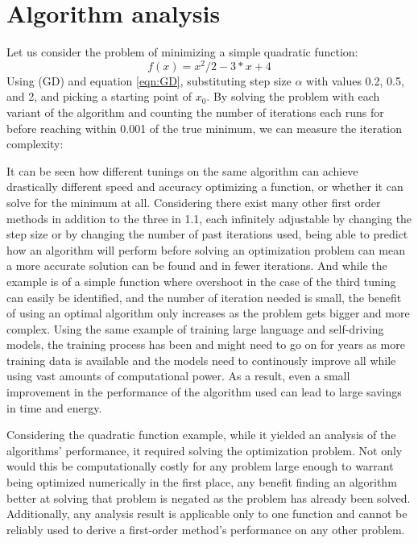 \section{Algorithm analysis}
Let us consider the problem of minimizing a simple quadratic function:
\begin{equation} \label{eqn:quadratic}
    f(x) = x^2/2 - 3*x + 4
  \end{equation}
Using (GD) and equation \ref{eqn:GD}, substituting step size $\alpha$ with values 0.2, 0.5, and 2, and picking a starting point of $x_0$. By solving the problem with each variant of the algorithm and counting the number of iterations each runs for before reaching within 0.001 of the true minimum, we can measure the iteration complexity:

It can be seen how different tunings on the same algorithm can achieve drastically different speed and accuracy optimizing a function, or whether it can solve for the minimum at all. Considering there exist many other first order methods in addition to the three in 1.1, each infinitely adjustable by changing the step size or by changing the number of past iterations used, being able to predict how an algorithm will perform before solving an optimization problem can mean a more accurate solution can be found and in fewer iterations. And while the example is of a simple function where overshoot in the case of the third tuning can easily be identified, and the number of iteration needed is small, the benefit of using an optimal algorithm only increases as the problem gets bigger and more complex. Using the same example of training large language and self-driving models, the training process has been and might need to go on for years as more training data is available and the models need to continously improve all while using vast amounts of computational power. As a result, even a small improvement in the performance of the algorithm used can lead to large savings in time and energy.

Considering the quadratic function example, while it yielded an analysis of the algorithms' performance, it required solving the optimization problem. Not only would this be computationally costly for any problem large enough to warrant being optimized numerically in the first place, any benefit finding an algorithm better at solving that problem is negated as the problem has already been solved. Additionally, any analysis result is applicable only to one function and cannot be reliably used to derive a first-order method's performance on any other problem.

